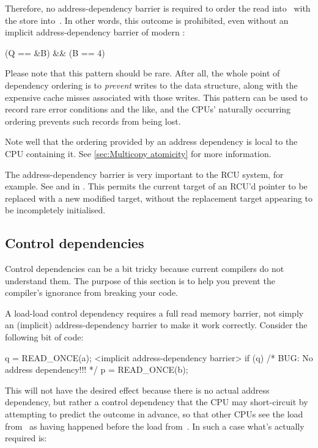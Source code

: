 Therefore, no address-dependency barrier is required to order the read
into~ with the store into~.
In other words, this outcome is prohibited,
even without an implicit address-dependency barrier of modern :

\begin{VerbatimU}
	(Q == &B) && (B == 4)
\end{VerbatimU}

Please note that this pattern should be rare.
After all, the whole point of dependency ordering is to \emph{prevent}
writes to the data structure, along with the expensive cache misses
associated with those writes.
This pattern can be used to record rare error conditions and the like,
and the CPUs' naturally occurring ordering prevents such records from
being lost.


Note well that the ordering provided by an address dependency is local to
the CPU containing it.
See \cref{sec:Multicopy atomicity} for more information.


The address-dependency barrier is very important to the RCU system,
for example.
See  and  in
.
This permits the current target of an RCU'd pointer to be replaced with
a new modified target, without the replacement target appearing to be
incompletely initialised.


\subsection{Control dependencies}
\label{sec:Control dependencies}

Control dependencies can be a bit tricky because current compilers do
not understand them.
The purpose of this section is to help you prevent the compiler's ignorance
from breaking your code.

A load-load control dependency requires a full read memory barrier, not
simply an (implicit) address-dependency barrier to make it work correctly.
Consider the following bit of code:

\begin{VerbatimU}
	q = READ_ONCE(a);
	<implicit address-dependency barrier>
	if (q) {
		/* BUG: No address dependency!!! */
		p = READ_ONCE(b);
	}
\end{VerbatimU}

This will not have the desired effect because there is no actual address
dependency, but rather a control dependency that the CPU may short-circuit
by attempting to predict the outcome in advance, so that other CPUs see
the load from~ as having happened before the load from~.
In such a case what's actually required is:

